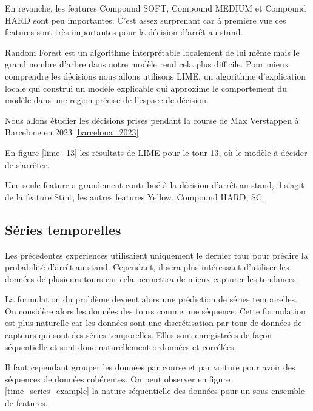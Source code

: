 En revanche, les features Compound SOFT, Compound MEDIUM et Compound HARD sont peu importantes.
C'est assez surprenant car à première vue ces features sont très importantes pour la décision d'arrêt au stand.

Random Forest est un algorithme interprétable localement de lui même mais le grand nombre d'arbre dans notre modèle rend cela plus difficile.
Pour mieux comprendre les décisions nous allons utilisons LIME, un algorithme d'explication locale qui construi un modèle explicable qui approxime le comportement du modèle dans une region précise de l'espace de décision.

Nous allons étudier les décisions prises pendant la course de Max Verstappen à Barcelone en 2023 \ref{barcelona_2023}

En figure \ref{lime_13} les résultats de LIME pour le tour 13, où le modèle à décider de s'arrêter.

Une seule feature a grandement contribué à la décision d'arrêt au stand, il s'agit de la feature Stint, les autres features Yellow, Compound HARD, SC.


\subsection{Séries temporelles}

Les précédentes expériences utilisaient uniquement le dernier tour pour prédire la probabilité d'arrêt au stand.
Cependant, il sera plus intéressant d'utiliser les données de plusieurs tours car cela permettra de mieux capturer les tendances.

La formulation du problème devient alors une prédiction de séries temporelles.
On considère alors les données des tours comme une séquence.
Cette formulation est plus naturelle car les données sont une discrétisation par tour de données de capteurs qui sont des séries temporelles.
Elles sont enregistrées de façon séquentielle et sont donc naturellement ordonnées et corrélées.

Il faut cependant grouper les données par course et par voiture pour avoir des séquences de données cohérentes.
On peut observer en figure \ref{time_series_example} la nature séquentielle des données pour un sous ensemble de features.
